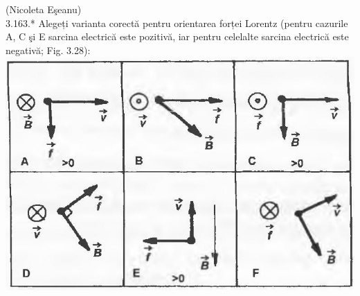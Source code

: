 \documentclass[10pt]{article}
\begin{document}
(Nicoleta Eşeanu)\\
3.163.* Alegeți varianta corectă pentru orientarea forței Lorentz (pentru cazurile A, C şi E sarcina electrică este pozitivă, iar pentru celelalte sarcina electrică este negativă; Fig. 3.28):\\
\includegraphics[max width=\textwidth, center]{2025_07_01_5b3ff9fa0d508c8e9f17g-180(1)}
\end{document}
